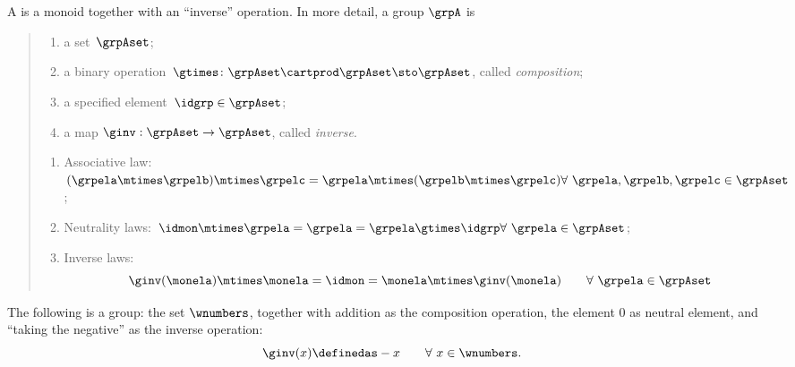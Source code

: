 

\section{}\label{sec:groups}


\begin{ctdefinition}[Group]
  \label{def:group}
  A \emph{} is a monoid together with an ``inverse'' operation.
  In more detail, a group $\grpA$ is
  \begin{quote}
    \constit
    \begin{enumerate}
      \item a set~$\grpAset$;
      \item a binary operation~$\gtimes \colon \grpAset \cartprod \grpAset \sto \grpAset$, called \emph{composition};
      \item a specified element~$\idgrp \in \grpAset$;
      \item a map $\ginv: \grpAset \to \grpAset$, called \emph{inverse}.
    \end{enumerate}
    \condit
    \begin{enumerate}
      \item Associative law:~$(\grpela\mtimes \grpelb)\mtimes \grpelc=\grpela\mtimes (\grpelb\mtimes \grpelc) \hfill \forall \  \grpela, \grpelb, \grpelc \in \grpAset$;
      \item Neutrality laws:~$\idmon\mtimes \grpela=\grpela=\grpela \gtimes \idgrp \hfill \forall \  \grpela \in \grpAset$;
      \item Inverse laws:
      \begin{equation}\label{eq:group-inverse-law}
        \ginv(\monela) \mtimes \monela = \idmon =  \monela \mtimes \ginv(\monela)  \quad \quad \forall \  \grpela  \in \grpAset
      \end{equation}
    \end{enumerate}
  \end{quote}
\end{ctdefinition}

\begin{example}
The following is a group: the set $\wnumbers$, together with addition as the composition operation, the element $0$ as neutral element, and ``taking the negative'' as the inverse operation:
\begin{equation}
\ginv(x) \definedas -x \quad \quad \forall \ x \in \wnumbers.
\end{equation}
\end{example}

